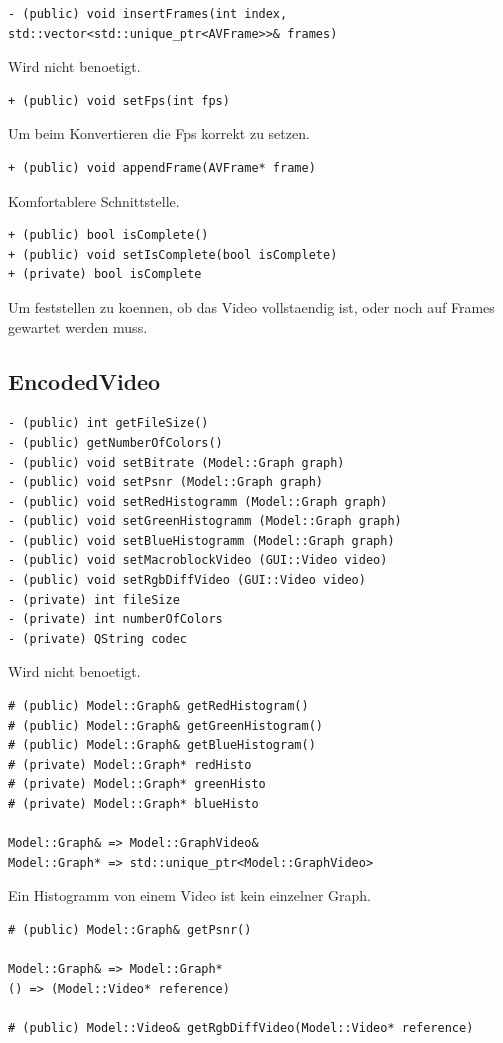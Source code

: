\documentclass{scrartcl}
\begin{document}
{\begin{verbatim}
- (public) void insertFrames(int index, std::vector<std::unique_ptr<AVFrame>>& frames)
\end{verbatim}
Wird nicht benoetigt.

\begin{verbatim}
+ (public) void setFps(int fps)
\end{verbatim}
Um beim Konvertieren die Fps korrekt zu setzen.
\begin{verbatim}
+ (public) void appendFrame(AVFrame* frame)
\end{verbatim}
Komfortablere Schnittstelle.
\begin{verbatim}
+ (public) bool isComplete()
+ (public) void setIsComplete(bool isComplete)
+ (private) bool isComplete
\end{verbatim}
Um feststellen zu koennen, ob das Video vollstaendig ist, oder noch auf Frames gewartet werden muss.
\subsection{EncodedVideo}
\begin{verbatim}
- (public) int getFileSize()
- (public) getNumberOfColors()
- (public) void setBitrate (Model::Graph graph)
- (public) void setPsnr (Model::Graph graph)
- (public) void setRedHistogramm (Model::Graph graph)
- (public) void setGreenHistogramm (Model::Graph graph)
- (public) void setBlueHistogramm (Model::Graph graph)
- (public) void setMacroblockVideo (GUI::Video video)
- (public) void setRgbDiffVideo (GUI::Video video)
- (private) int fileSize
- (private) int numberOfColors
- (private) QString codec
\end{verbatim}
Wird nicht benoetigt.
\begin{verbatim}
# (public) Model::Graph& getRedHistogram()
# (public) Model::Graph& getGreenHistogram()
# (public) Model::Graph& getBlueHistogram()
# (private) Model::Graph* redHisto
# (private) Model::Graph* greenHisto
# (private) Model::Graph* blueHisto

Model::Graph& => Model::GraphVideo&
Model::Graph* => std::unique_ptr<Model::GraphVideo>
\end{verbatim}
Ein Histogramm von einem Video ist kein einzelner Graph.
\begin{verbatim}
# (public) Model::Graph& getPsnr()

Model::Graph& => Model::Graph*
() => (Model::Video* reference)

# (public) Model::Video& getRgbDiffVideo(Model::Video* reference)


\end{verbatim}}
\end{document}
